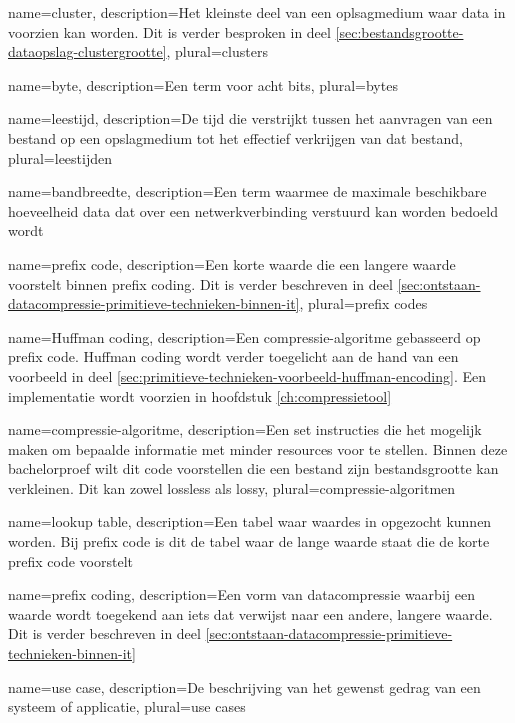{
	name={cluster},
	description={Het kleinste deel van een oplsagmedium waar data in voorzien kan worden. Dit is verder besproken in deel \ref{sec:bestandsgrootte-dataopslag-clustergrootte}},
	plural={clusters}
}

{
	name={byte},
	description={Een term voor acht bits},
	plural={bytes}
}

{
	name={leestijd},
	description={De tijd die verstrijkt tussen het aanvragen van een bestand op een opslagmedium tot het effectief verkrijgen van dat bestand},
	plural={leestijden}
}

{
	name={bandbreedte},
	description={Een term waarmee de maximale beschikbare hoeveelheid data dat over een netwerkverbinding verstuurd kan worden bedoeld wordt}
}

{
	name={prefix code},
	description={Een korte waarde die een langere waarde voorstelt binnen prefix coding. Dit is verder beschreven in deel \ref{sec:ontstaan-datacompressie-primitieve-technieken-binnen-it}},
	plural={prefix codes}
}

{
	name={Huffman coding},
	description={Een compressie-algoritme gebasseerd op prefix code. Huffman coding wordt verder toegelicht aan de hand van een voorbeeld in deel \ref{sec:primitieve-technieken-voorbeeld-huffman-encoding}. Een implementatie wordt voorzien in hoofdstuk \ref{ch:compressietool}}
}

{
	name={compressie-algoritme},
	description={Een set instructies die het mogelijk maken om bepaalde informatie met minder resources voor te stellen. Binnen deze bachelorproef wilt dit code voorstellen die een bestand zijn bestandsgrootte kan verkleinen. Dit kan zowel lossless als lossy},
	plural={compressie-algoritmen}
}

{
	name={lookup table},
	description={Een tabel waar waardes in opgezocht kunnen worden. Bij prefix code is dit de tabel waar de lange waarde staat die de korte prefix code voorstelt}
}

{
	name={prefix coding},
	description={Een vorm van datacompressie waarbij een waarde wordt toegekend aan iets dat verwijst naar een andere, langere waarde. Dit is verder beschreven in deel \ref{sec:ontstaan-datacompressie-primitieve-technieken-binnen-it}}
}

{
	name={use case},
	description={De beschrijving van het gewenst gedrag van een systeem of applicatie},
	plural={use cases}
}


